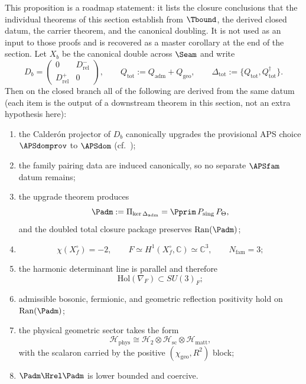 \begin{proposition}
\label{thm:master-closure}
\label{prop:master-closure-roadmap}
\label{ass:remaining-closure-inputs}
This proposition is a roadmap statement: it lists the closure conclusions that the individual
theorems of this section establish from $\Tbound$, the derived closed datum, the carrier theorem, and the
canonical doubling. It is not used as an input to those proofs and is recovered as a master
corollary at the end of the section. Let $X_b$ be the canonical double across $\Seam$ and write
\[
D_b=
\begin{pmatrix}
0&D_{\mathrm{rel}}^-\\
D_{\mathrm{rel}}^+&0
\end{pmatrix},
\qquad
Q_{\mathrm{tot}}:=Q_{\mathrm{adm}}+Q_{\mathrm{geo}},
\qquad
\Delta_{\mathrm{tot}}:=\{Q_{\mathrm{tot}},Q_{\mathrm{tot}}^\dagger\}.
\]
Then on the closed branch all of the following are derived from the same datum (each item is the
output of a downstream theorem in this section, not an extra hypothesis here):
\begin{enumerate}[label=(\arabic*), leftmargin=1.5em, topsep=3pt, itemsep=2pt]
    \item the Calder\'on projector of $D_b$ canonically upgrades the provisional APS choice
    $\APSdomprov$ to $\APSdom$ (cf.\ );
    \item the family pairing data are induced canonically, so no separate $\APSfam$ datum remains;
    \item the upgrade theorem  produces
    \[
    \Padm:=\Pi_{\ker \Delta_{\mathrm{adm}}}
    =
    \Pprim\,P_{\mathrm{sing}}\,P_\Theta,
    \]
    and the doubled total closure package preserves $\mathrm{Ran}(\Padm)$;
    \item
    \[
    \chi(X_f^\circ)=-2,
    \qquad
    F\simeq H^1(X_f^\circ,\mathbb C)\simeq \mathbb C^3,
    \qquad
    N_{\mathrm{fam}}=3;
    \]
    \item the harmonic determinant line is parallel and therefore
    \[
    \mathrm{Hol}(\nabla_F)\subset SU(3)_F;
    \]
    \item admissible bosonic, fermionic, and geometric reflection positivity hold on $\mathrm{Ran}(\Padm)$;
    \item the physical geometric sector takes the form
    \[
    \mathcal H_{\mathrm{phys}}
    \cong
    \mathcal H_2\otimes\mathcal H_{\mathrm{sc}}\otimes\mathcal H_{\mathrm{matt}},
    \]
    with the scalaron carried by the positive $(\chi_{\mathrm{geo}},R^2)$ block;
    \item $\Padm\Hrel\Padm$ is lower bounded and coercive.
\end{enumerate}
\end{proposition}

